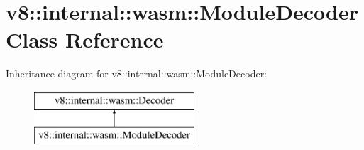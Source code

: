 \hypertarget{classv8_1_1internal_1_1wasm_1_1_module_decoder}{}\section{v8\+:\+:internal\+:\+:wasm\+:\+:Module\+Decoder Class Reference}
\label{classv8_1_1internal_1_1wasm_1_1_module_decoder}
Inheritance diagram for v8\+:\+:internal\+:\+:wasm\+:\+:Module\+Decoder\+:\begin{figure}[H]
\begin{center}
\leavevmode
\includegraphics[height=2.000000cm]{classv8_1_1internal_1_1wasm_1_1_module_decoder}
\end{center}
\end{figure}
